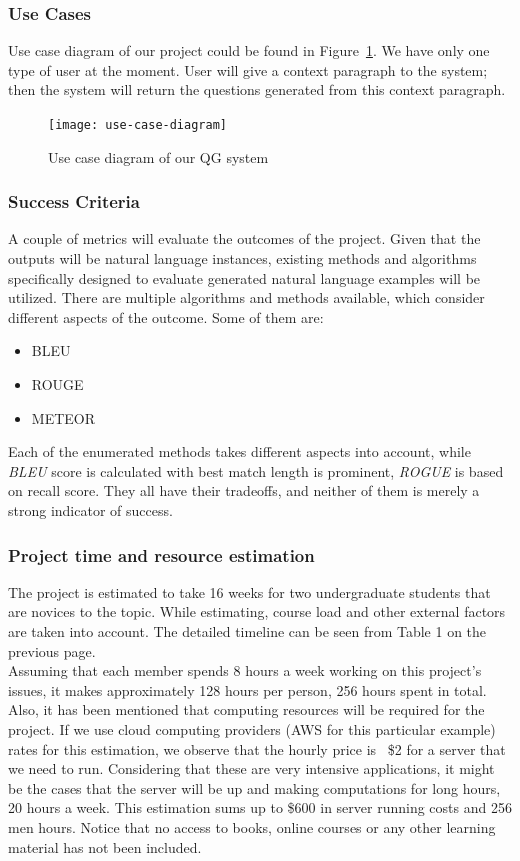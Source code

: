 \documentclass{mefsdp}
\begin{document}
	\pagebreak
	\subsubsection{Use Cases}
	Use case diagram of our project could be found in Figure \ref{usecases}. We have only one type of user at the moment. User will give a context paragraph to the system; then the system will return the questions generated from this context paragraph.
	\begin{figure}[ht!]
		\centering
		\texttt{[image: use-case-diagram]}
		\caption{Use case diagram of our QG system\label{usecases}}
	\end{figure}
	
	\subsubsection{Success Criteria}\label{sc}
	A couple of metrics will evaluate the outcomes of the project. Given that the outputs will be natural language instances, existing methods and algorithms specifically designed to evaluate generated natural language examples will be utilized. There are multiple algorithms and methods available, which consider different aspects of the outcome. Some of them are:
	\begin{itemize}
		\item BLEU
		\item ROUGE
		\item METEOR\\
	\end{itemize}
	
	Each of the enumerated methods takes different aspects into account, while \textit{BLEU} score is calculated with best match length is prominent, \textit{ROGUE} is based on recall score. They all have their tradeoffs, and neither of them is merely a strong indicator of success.
	
	\subsubsection{Project time and resource estimation}
	The project is estimated to take 16 weeks for two undergraduate students that are novices to the topic. While estimating, course load and other external factors are taken into account. The detailed timeline can be seen from Table 1 on the previous page. \\
	
	Assuming that each member spends 8 hours a week working on this project's issues, it makes approximately 128 hours per person, 256 hours spent in total. Also, it has been mentioned that computing resources will be required for the project. If we use cloud computing providers (AWS for this particular example) rates for this estimation, we observe that the hourly price is ~\$2 for a server that we need to run. Considering that these are very intensive applications, it might be the cases that the server will be up and making computations for long hours, 20 hours a week. This estimation sums up to \$600 in server running costs and 256 men hours. Notice that no access to books, online courses or any other learning material has not been included.
	
\end{document}
